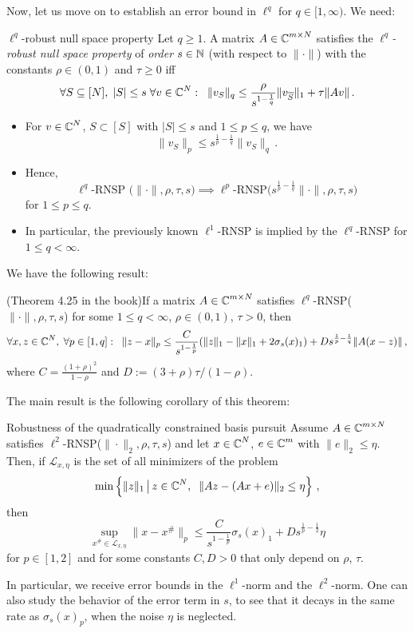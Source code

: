 \documentclass[a4paper]{article}
\begin{document}
    Now, let us move on to establish an error bound in \(\ell^q\) for \(q\in [1,\infty)\). We need:
    \begin{Def*}
 {$\ell^q$-robust null space property}{}
 Let \(q\ge 1\). A matrix \(A\in \operatorname{\mathbb C}^{m\times N}\) satisfies the \emph{$\ell^q$-robust null space property} of \emph{order} \(s\in \operatorname{\mathbb N}\) (with respect to \(\|\cdot\|\)) with the constants \(\rho\in (0,1)\) and \(\tau\ge0\) iff
 \[\forall S\subseteq [N],\;|S|\le s\;\forall v\in \operatorname{\mathbb C}^N:\;\;\|v_S\|_q\le \frac{\rho}{s^{1-\frac{1}{q}}}\|v_{\overline S}\|_1+\tau\|Av\|\,.\]
 \end{Def*}
 \begin{Bemerkung*}{}{}
     \begin{itemize}
		\item For \(v\in \operatorname{\mathbb C}^N \), \(S\subset [S]\) with \(|S|\le s\) and \(1\le p\le q\), we have 
		\[\|v_S\|_p\le s^{\frac{1}{p}-\frac{1}{q}}\|v_S\|_q\,.\]
		\item Hence, 
		\[
		\ell^q
		\text{-RNSP
		($\|\cdot\|,\rho,\tau,s$)}
		\implies \ell^p \text{-RNSP($s^{\frac{1}{p}-\frac{1}{q}}\|\cdot\|,\rho,\tau,s$)}
		\]
        for \(1\le p\le q\).
		\item In particular, the previously known \(\ell^1\)-RNSP is implied by the \(\ell^q\)-RNSP for \(1\le q<\infty\).
	\end{itemize}
 \end{Bemerkung*}    

 We have the following result:
 \begin{Satz*}
		{(Theorem 4.25 in the book)}{}If a matrix \(A\in \operatorname{\mathbb C}^{m\times N}\) satisfies \(\ell^q\)-RNSP($\|\cdot\|,\rho,\tau,s$) for some \(1\le q<\infty\), \(\rho\in (0,1)\), \(\tau>0\), then
		\begin{align*}
			&\forall x,z\in \operatorname{\mathbb C}^N,\;\forall p\in [1,q]:\;\;\|z-x\|_p\le \frac{C}{s^{1-\frac{1}{p}}}(\|z\|_1-\|x\|_1+2\sigma_s(x)_1)+Ds^{\frac{1}{p}-\frac{1}{q}}\|A(x-z)\|\,,\\
		\end{align*}
		where \(C=\frac{(1+\rho)^2}{1-\rho}\) and \(D:=(3+\rho)\tau/(1-\rho)\).
	\end{Satz*}

   The main result is the following corollary of this theorem:
   \begin{Kor*}
		{Robustness of the quadratically constrained basis pursuit}{}
		Assume \(A\in \operatorname{\mathbb C}^{m\times N }\) satisfies \(\ell^2 \)-RNSP($\|\cdot\|_2,\rho,\tau, s$) and let \(x\in \operatorname{\mathbb C}^N\), \(e\in \operatorname{\mathbb C}^m\) with \(\|e\|_2\le \eta\). Then, if \(\mathcal L_{x,\eta}\) is the set of all minimizers of the problem
		\[\min\left\{\|z\|_1\,\big|\,z\in \operatorname{\mathbb C}^N,\;\;\|Az-(Ax+e)\|_2\le \eta\right\}\,,\]
		then
		\[\sup_{x^{\#}\in \mathcal L_{x,\eta}}\|x-x^{\#}\|_p\le \frac{C}{s^{1-\frac{1}{p}}}\sigma_s(x)_1+Ds^{\frac{1}{p}-\frac{1}{2}}\eta\]
		for \(p\in [1,2]\) and for some constants \(C,D>0\) that only depend on \(\rho\), \(\tau\).
	\end{Kor*} 
In particular, we receive error bounds in the \(\ell^1\)-norm and the \(\ell^2\)-norm. One can also study the behavior of the error term in \(s\), to see that it decays in the same rate as \(\sigma_s(x)_p\), when the noise \(\eta\) is neglected.
\end{document}
